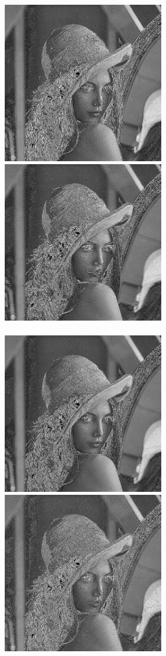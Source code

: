 \documentclass[a4paper,12pt,openany]{report}
\begin{document}
\begin{center}
\\
\includegraphics[width=7cm]{resources/modified/lena/lena_sharpen_3x11.jpg}
\includegraphics[width=7cm]{resources/modified/lena/lena_sharpen_11x3.jpg}
\\
\\
\includegraphics[width=7cm]{resources/modified/lena/lena_sharpen_7x7.jpg}
\includegraphics[width=7cm]{resources/modified/lena/lena_sharpen_9x9.jpg}

\end{center}
\end{document}
